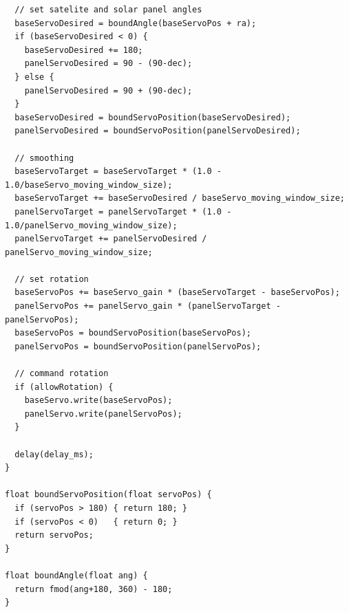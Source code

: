 \begin{lstlisting}
  // set satelite and solar panel angles
  baseServoDesired = boundAngle(baseServoPos + ra);
  if (baseServoDesired < 0) {
    baseServoDesired += 180;
    panelServoDesired = 90 - (90-dec);
  } else {
    panelServoDesired = 90 + (90-dec);
  }
  baseServoDesired = boundServoPosition(baseServoDesired);
  panelServoDesired = boundServoPosition(panelServoDesired);

  // smoothing
  baseServoTarget = baseServoTarget * (1.0 - 1.0/baseServo_moving_window_size);
  baseServoTarget += baseServoDesired / baseServo_moving_window_size;
  panelServoTarget = panelServoTarget * (1.0 - 1.0/panelServo_moving_window_size);
  panelServoTarget += panelServoDesired / panelServo_moving_window_size;

  // set rotation
  baseServoPos += baseServo_gain * (baseServoTarget - baseServoPos);
  panelServoPos += panelServo_gain * (panelServoTarget - panelServoPos);
  baseServoPos = boundServoPosition(baseServoPos);
  panelServoPos = boundServoPosition(panelServoPos);

  // command rotation
  if (allowRotation) {
    baseServo.write(baseServoPos);
    panelServo.write(panelServoPos);
  }

  delay(delay_ms);
}

float boundServoPosition(float servoPos) {
  if (servoPos > 180) { return 180; } 
  if (servoPos < 0)   { return 0; }
  return servoPos;
}

float boundAngle(float ang) {
  return fmod(ang+180, 360) - 180;
}

\end{lstlisting}